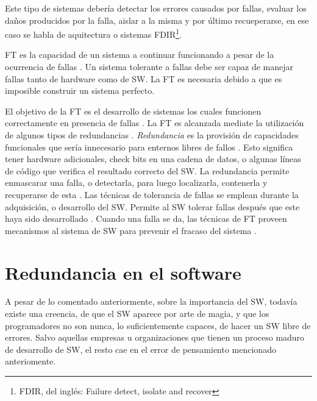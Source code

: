 Este tipo de sistemas debería detectar los errores causados por fallas, evaluar los daños 
producidos por la falla, aislar a la misma y por último recueperarse, en ese caso se habla de 
aquitectura o sistemas \acs{FDIR}\footnote{FDIR, del inglés: Failure detect, isolate and recover}.

\ac{FT} es la capacidad de un sistema a continuar funcionando a pesar de la ocurrencia 
de fallas \citep{FTDesign}. Un sistema tolerante a fallas debe ser capaz de manejar fallas tanto de 
hardware como de \ac{SW}. La \ac{FT} es necesaria debido a que es imposible construir 
un sistema perfecto.

El objetivo de la \ac{FT} es el desarrollo de sistemas los cuales funcionen correctamente en 
presencia de fallas \citep{FTDesign}. La \ac{FT} es alcanzada mediate la utilización de algunos 
tipos de redundancias \citep{FTDesign}. \textit{Redundancia} es la provisión de capacidades 
funcionales que sería innecesario para enternos libres de fallos \citep{FTDesign}. Esto significa 
tener hardware adicionales, check bits en una cadena de datos, o algunas l\'ineas de c\'odigo que 
verifica el resultado correcto del \ac{SW}. La redundancia permite enmascarar una falla, o 
detectarla, para luego localizarla, contenerla y recuperarse de esta \citep{FTDesign}. Las 
técnicas de tolerancia de fallas se emplean durante la adquisición, o desarrollo del \ac{SW}. 
Permite al \ac{SW} tolerar fallas después que este haya sido desarrollado \citep{Pullum01}. Cuando 
una falla se da, las técnicas de \ac{FT} proveen mecanismos al sistema de \ac{SW} para prevenir el 
fracaso del sistema \citep{Pullum01}.


\section{Redundancia en el software}\label{sec:redundancias_sw}
A pesar de lo comentado anteriormente, sobre la importancia del \ac{SW}, todavía existe una 
creencia, de que el \ac{SW} aparece por arte de magia, y que los programadores no son nunca, lo 
suficientemente capaces, de hacer un \ac{SW} libre de errores. Salvo aquellas empresas u 
organizaciones que tienen un proceso maduro de desarrollo de \ac{SW}, el resto cae en el error de 
pensamiento mencionado anteriomente. 

